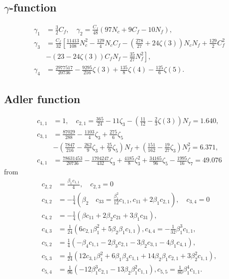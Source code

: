 \subsection{$\gamma$-function}
\begin{equation}
	\begin{split}
		\gamma_1 &= \frac{3}{2} C_f, \quad \gamma_2 = \frac{C_f}{48} (97 N_c + 9 C_f - 10 N_f), \\
		\gamma_3 &= \frac{C_f}{32} \left[\frac{11413}{108}N_c^2 - \frac{129}{4} N_c C_f - \left(\frac{278}{27} + 24 \zeta(3) \right) N_c N_f + \frac{129}{2} C_f^2 \right. \\
		&\left.- \left(23 - 24 \zeta(3)  \right) C_f N_f - \frac{35}{27}N_f^2\right], \\
		\gamma_4 &= \frac{2977517}{20736}-\frac{9295}{216}\zeta(3) + \frac{135}{8} \zeta(4) - \frac{125}{6}\zeta(5).
	\end{split}
\end{equation}	

\subsection{Adler function}
\begin{equation}
	\begin{split}
		c_{1,1} &= 1, \quad c_{2,1} = \frac{365}{24} - 11 \zeta_3 - \left(\frac{11}{12} - \frac{2}{3}\zeta(3) \right) N_f = 1.640, \\
		c_{3,1} &= \frac{87029}{288} - \frac{1103}{4} \zeta_3 + \frac{275}{6} \zeta_5 \\
		& - \left(\frac{7847}{216} - \frac{262}{9} \zeta_3 + \frac{25}{9}\zeta_5 \right) N_f + \left( \frac{151}{162} - \frac{19}{27} \zeta_3 \right) N_f^2 = 6.371, \\
		c_{4,1} &= \frac{78631453}{20736} - \frac{1704247}{432} \zeta_3 + \frac{4185}{8} \zeta_3^2 + \frac{34165}{96} \zeta_5 - \frac{1995}{16} \zeta_7 = 49.076
	\end{split}
\end{equation}
from \cite{Jamin2006}
\begin{equation}
	\begin{split}
		c_{2,2} &= \frac{\beta_1 c_{1,1}}{4}, \quad c_{2,3} = 0 \\
		c_{3,2} &= -\frac{1}{4}(\beta_2 \quad c_{33} = \frac{\beta_1^2}{12} c_{1,1}, c_{11} +  2 \beta_1 c_{2,1} ), \quad c_{3,4} = 0 \\
		c_{4,2} &= -\frac{1}{4} (\beta c_{11} + 2 \beta_2 c_{21} + 3 \beta_1 c_{31}), \\
		c_{4,3} &= \frac{1}{24}(6 c_{2,1} \beta_1^2 + 5 \beta_2 \beta_1 c_{1,1}), c_{4,4} = - \frac{1}{32} \beta_1^3 c_{1,1}, \\
		c_{5,2} &= \frac{1}{4}(-\beta_4 c_{1,1} - 2\beta_3 c_{2,1} - 3 \beta_2 c_{3,1} - 4 \beta_1 c_{4,1}), \\
		c_{5,3} &= \frac{1}{24} ( 12 c_{3,1} \beta_1^2 + 6 \beta_1 \beta_3 c_{1,1} + 14 \beta_2 \beta_1 c_{2,1} + 3 \beta_2^2 c_{1,1}), \\
		c_{5,4} &= \frac{1}{96} (-12 \beta_1^3 c_{2,1} - 13 \beta_2 \beta_1^2 c_{1,1}), c_{5,5} = \frac{1}{80} \beta_1^4 c_{1,1}.
	\end{split}
\end{equation}

